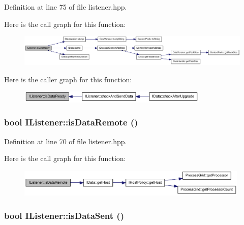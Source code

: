 Definition at line 75 of file listener.hpp.

Here is the call graph for this function:\nopagebreak
\begin{figure}[H]
\begin{center}
\leavevmode
\includegraphics[width=420pt]{class_i_listener_a2a9973fb9b26f21ee034d4ba0349e541_cgraph}
\end{center}
\end{figure}


Here is the caller graph for this function:\nopagebreak
\begin{figure}[H]
\begin{center}
\leavevmode
\includegraphics[width=257pt]{class_i_listener_a2a9973fb9b26f21ee034d4ba0349e541_icgraph}
\end{center}
\end{figure}
\hypertarget{class_i_listener_af8508f7394c3a5171d283f94c117f806}{
\subsubsection[{isDataRemote}]{\setlength{\rightskip}{0pt plus 5cm}bool IListener::isDataRemote ()}}
\label{class_i_listener_af8508f7394c3a5171d283f94c117f806}


Definition at line 70 of file listener.hpp.

Here is the call graph for this function:\nopagebreak
\begin{figure}[H]
\begin{center}
\leavevmode
\includegraphics[width=314pt]{class_i_listener_af8508f7394c3a5171d283f94c117f806_cgraph}
\end{center}
\end{figure}
\hypertarget{class_i_listener_af0cb8b56c305486c399dc60427864ef4}{
\subsubsection[{isDataSent}]{\setlength{\rightskip}{0pt plus 5cm}bool IListener::isDataSent ()}}
\label{class_i_listener_af0cb8b56c305486c399dc60427864ef4}


